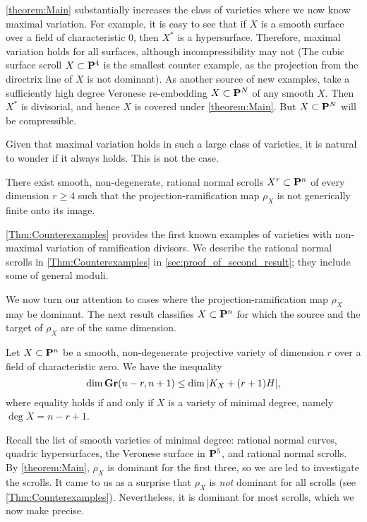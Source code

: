 \documentclass[11pt,reqno]{amsart}
\theoremstyle{plain}
\theoremstyle{definition}
\theoremstyle{remark}
\numberwithin{equation}{section}
\numberwithin{equation}{section}
\begin{document}
\autoref{theorem:Main} substantially increases the class of varieties where we now know maximal variation.
For example, it is easy to see that if $X$ is a smooth surface over a field of characteristic $0$, then $X^*$ is a hypersurface.
Therefore, maximal variation holds for all surfaces, although incompressibility may not (The cubic surface scroll $X \subset \P^4$ is the smallest counter example, as the projection from the directrix line of $X$ is not dominant).
As another source of new examples, take a sufficiently high degree Veronese re-embedding $X \subset \P^N$ of any smooth $X$.
Then $X^*$ is divisorial, and hence $X$ is covered under \autoref{theorem:Main}.
But $X \subset \P^N$ will be compressible.

Given that maximal variation holds in such a large class of varieties, it is natural to wonder if it always holds.
This is not the case.
\begin{maintheorem}
  \label{Thm:Counterexamples}
  There exist smooth, non-degenerate, rational normal scrolls $X^{r} \subset \P^{n}$ of every dimension $r \geq 4$ such that the projection-ramification map $\rho_{X}$ is not generically finite onto its image.
\end{maintheorem}
\autoref{Thm:Counterexamples} provides the first known examples of varieties with non-maximal variation of ramification divisors.
We describe the rational normal scrolls in \autoref{Thm:Counterexamples} in \autoref{sec:proof_of_second_result}; they include some of general moduli.

We now turn our attention to cases where the projection-ramification map $\rho_X$ may be dominant.
The next result classifies $X \subset \P^n$ for which the source and the target of $\rho_X$ are of the same dimension.
\begin{maintheorem}\label{theorem:minimaldegree}
  Let $X \subset \P^{n}$ be a smooth, non-degenerate projective variety of dimension $r$ over a field of characteristic zero.
  We have the inequality
  \[ \dim \Gr(n-r, n+1) \leq \dim |K_X + (r+1)H|,\]
  where equality holds if and only if $X$ is a variety of minimal degree, namely $\deg X = n-r+1$.
\end{maintheorem}
Recall the list of smooth varieties of minimal degree: rational normal curves, quadric hypersurfaces, the Veronese surface in $\P^5$, and rational normal scrolls.
By \autoref{theorem:Main}, $\rho_X$ is dominant for the first three, so we are led to investigate the scrolls.
It came to us as a surprise that $\rho_X$ is \emph{not} dominant for all scrolls (see \autoref{Thm:Counterexamples}).
Nevertheless, it is dominant for most scrolls, which we now make precise.
\end{document}
